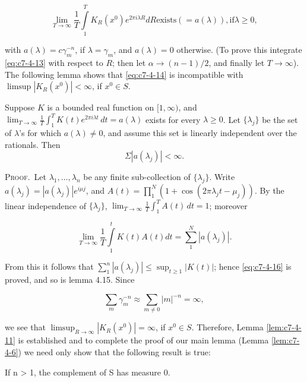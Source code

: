 \begin{equation}\label{eq:c7-4-14}
\lim_{T\to\infty}\frac{1}{T}\int\limits_{1}^{T}K_{R}(x^{0})e^{2\pi i\lambda R}d R\text{exists}(=a(\lambda)),\text{if}\lambda\geq0,
\end{equation}

with $a(\lambda) = c\gamma_m^{-n}$, if $\lambda = \gamma_m$, and $a(\lambda) = 0$ otherwise. (To prove this integrate \eqref{eq:c7-4-13} with respect to $R$; then let $\alpha \to (n-1)/2$, and finally let $T \to \infty$). The following lemma shows that \eqref{eq:c7-4-14} is incompatible with $\limsup |K_R(x^0)| < \infty$, if $x^0 \in S$.

\begin{lemma}
\label{lem:c7-4-15}
Suppose $K$ is a bounded real function on $[1, \infty)$, and $\lim_{T \to \infty} \frac{1}{T} \int_{1}^{T} K(t) e^{2\pi i \lambda t} \, dt = a(\lambda)$ exists for every $\lambda \geq 0$. Let $\{\lambda_j\}$ be the set of $\lambda$'s for which $a(\lambda) \neq 0$, and assume this set is linearly independent over the
rationals. Then
\begin{equation}\label{eq:c7-4-16}
\Sigma|a(\lambda_{j})|<\infty.
\end{equation}

\end{lemma}

\textsc{Proof.}\ Let $\lambda_{1}, \ldots, \lambda_{n}$ be any finite sub-collection of $\{\lambda_{j}\}$. Write $a(\lambda_{j}) = |a(\lambda_{j})| e^{i\mu j}$, and $A(t) = \prod_{1}^{N} (1 + \cos (2\pi\lambda_{j}t - \mu_{j}))$. By the linear independence of $\{\lambda_{j}\}$, $\lim_{T \to \infty} \frac{1}{T} \int_{1}^{T} A(t) \, dt = 1$; moreover

\[
\lim_{T\to\infty}\frac{1}{T}\int\limits_{1}^{t}K(t)A(t)dt=\sum_{1}^{N}|a(\lambda_{j})|.
\]

From this it follows that $\sum_{1}^{n} |a(\lambda_j)| \leq \sup_{t \geq 1} |K(t)|$; hence \eqref{eq:c7-4-16} is proved, and so is lemma 4.15. Since

\[
\sum_{m}\gamma_{m}^{-n}\approx\sum_{m\neq0}|m|^{-n}=\infty,
\]

we see that $\limsup_{R \to \infty} |K_R(x^0)| = \infty$, if $x^0 \in S$. Therefore, Lemma \ref{lem:c7-4-11} is established and to complete the proof of our main lemma (Lemma \ref{lem:c7-4-6}) we need only show that the following result is true:

\begin{lemma}
\label{lem:c7-4-17}
If n > 1, the complement of S has measure 0.
\end{lemma}

